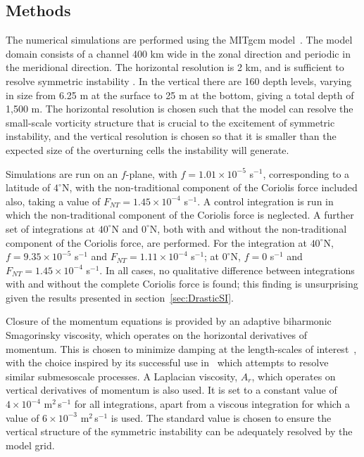 \subsection{Methods}
\label{subsec:2DMethods}
The numerical simulations are performed using the MITgcm model~\citep{Marshall1997}. The model domain consists of a channel 400 km wide in the zonal direction and periodic in the meridional direction. The horizontal resolution is 2 km, and is sufficient to resolve symmetric instability \citep[e.g.][]{Brannigan2017, Bachman2014}. In the vertical there are 160 depth levels, varying in size from 6.25 m at the surface to 25 m at the bottom, giving a total depth of 1,500 m. The horizontal resolution is chosen such that the model can resolve the small-scale vorticity structure that is crucial to the excitement of symmetric instability, and the vertical resolution is chosen so that it is smaller than the expected size of the overturning cells the instability will generate.

Simulations are run on an $f$-plane, with $f = 1.01 \times 10 ^{-5}$ s$^{-1}$, corresponding to a latitude of $4^\circ$N, with the non-traditional component of the Coriolis force included also, taking a value of $F_{NT} = 1.45 \times 10^{-4}$ s$^{-1}$. A control integration is run in which the non-traditional component of the Coriolis force is neglected. A further set of integrations at $40^\circ$N and $0^\circ$N, both with and without the non-traditional component of the Coriolis force, are performed. For the integration at $40^\circ$N, $f = 9.35 \times 10^{-5} $ s$^{-1}$ and $F_{NT} = 1.11 \times 10^{-4}$ s$^{-1}$; at $0^\circ$N, $f = 0$ s$^{-1}$ and $F_{NT} = 1.45 \times 10^{-4}$ s$^{-1}$. In all cases, no qualitative difference between integrations with and without the complete Coriolis force is found; this finding is unsurprising given the results presented in section~\ref{sec:DrasticSI}.

Closure of the momentum equations is provided by an adaptive biharmonic Smagorinsky viscosity, which operates on the horizontal derivatives of momentum. This is chosen to minimize damping at the length-scales of interest~\citep{Smagorinsky1963, Griffies2000}, with the choice inspired by its successful use in~\citet{Brannigan2016} which attempts to resolve similar submesoscale processes. A Laplacian viscosity, $A_r$, which operates on vertical derivatives of momentum is also used. It is set to a constant value of $4 \times 10^{-4}$ m$^2$\,s$^{-1}$ for all integrations, apart from a viscous integration for which a value of $6 \times 10^{-3}$ m$^2$\,s$^{-1}$ is used. The standard value is chosen to ensure the vertical structure of the symmetric instability can be adequately resolved by the model grid.

